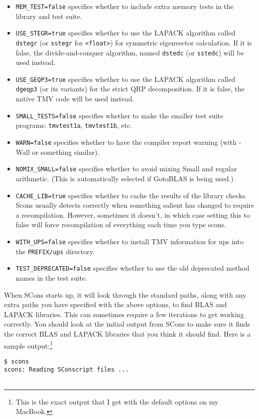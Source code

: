 \documentclass[twoside,letterpaper,11pt]{article}
\renewcommand{\tt}[1]{{\lstinline {#1}}}
\begin{document}
\begin{enumerate}
\begin{itemize}
\item \texttt{MEM\_TEST=false} specifies whether to include extra memory tests in the library and test suite.
\item \texttt{USE\_STEGR=true} specifies whether to use the LAPACK algorithm called
\tt{dstegr} (or \tt{sstegr} for \tt{<float>}) for symmetric
eigenvector calculation.  If it is false, the divide-and-conquer algorithm,
named \tt{dstedc} (or \tt{sstedc}) will be used instead.
\item
\texttt{USE\_GEQP3=true} specifies whether to use the LAPACK algorithm called
\tt{dgeqp3} (or its variants) for the strict QRP decomposition.  If it is false,
the native TMV code will be used instead.
\item \texttt{SMALL\_TESTS=false} specifies whether to make the smaller test suite programs: \texttt{tmvtest1a}, \texttt{tmvtest1b}, etc. 
\item \texttt{WARN=false} specifies whether to have the compiler report warning (with -Wall or
something similar).
\item \texttt{NOMIX\_SMALL=false} specifies whether to avoid mixing Small and regular arithmetic.  
(This is automatically selected if GotoBLAS is being used.)
\item \texttt{CACHE\_LIB=true} specifies whether to cache the results of the library checks.  Scons
usually detects correctly when something salient has changed to require a recompilation.  However,
sometimes it doesn't, in which case setting this to false will force recompilation of everything each
time you type scons.
\item \texttt{WITH\_UPS=false} specifies whether to install TMV information for ups into the \tt{PREFIX/ups} directory.
\item \texttt{TEST\_DEPRECATED=false} specifies whether to use the old deprecated method
names in the test suite.
\end{itemize}

When SCons starts up, it will look through the standard paths, along with any extra paths you have
specified with the above options, to find BLAS
and LAPACK libraries.  This can sometimes require a few iterations to get working correctly.  
You should look at the initial output from SCons to make sure it finds the correct BLAS
and LAPACK libraries that you think it should find.  Here is a sample output:\footnote{
This is the exact output that I get with the default options on my MacBook.}
\begin{verbatim}
$ scons
scons: Reading SConscript files ...


\end{verbatim}
\end{enumerate}
\end{document}

